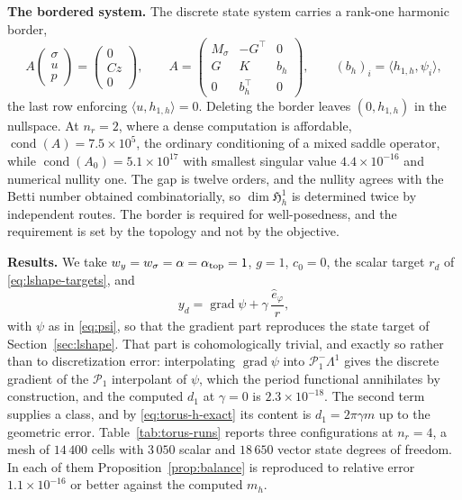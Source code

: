 \documentclass{article}
\DeclareMathOperator{\grad}{grad}
\newcommand{\HH}{\mathfrak H}
\newcommand{\ip}[2]{\langle #1,#2\rangle}
\begin{document}
\medskip
\noindent\textbf{The bordered system.}
The discrete state system carries a rank-one harmonic border,
\begin{equation}
  A\begin{pmatrix}\sigma\\u\\p\end{pmatrix}
  =\begin{pmatrix}0\\Cz\\0\end{pmatrix},
  \qquad
  A=\begin{pmatrix}
      M_{\sigma}&-G^{\top}&0\\ G&K&b_{h}\\ 0&b_{h}^{\top}&0
    \end{pmatrix},
  \qquad (b_{h})_{i}=\ip{h_{1,h}}{\psi_{i}},
\end{equation}
the last row enforcing $\ip{u}{h_{1,h}}=0$. Deleting the border leaves
$(0,h_{1,h})$ in the nullspace. At $n_{r}=2$, where a dense computation is
affordable, $\operatorname{cond}(A)=7.5\times10^{5}$, the ordinary
conditioning of a mixed saddle operator, while
$\operatorname{cond}(A_{0})=5.1\times10^{17}$ with smallest singular value
$4.4\times10^{-16}$ and numerical nullity one. The gap is twelve orders, and
the nullity agrees with the Betti number obtained combinatorially, so
$\dim\HH^{1}_{h}$ is determined twice by independent routes. The border is
required for well-posedness, and the requirement is set by the topology and
not by the objective.

\medskip
\noindent\textbf{Results.}
We take $w_{y}=w_{\sigma}=\alpha=\alpha_{\rm top}=1$, $g=1$, $c_{0}=0$, the
scalar target $r_{d}$ of \eqref{eq:lshape-targets}, and
\[
  y_{d}=\grad\psi+\gamma\,\frac{\hat e_{\varphi}}{r},
\]
with $\psi$ as in \eqref{eq:psi}, so that the gradient part reproduces the
state target of Section~\ref{sec:lshape}. That part is cohomologically
trivial, and exactly so rather than to discretization error: interpolating
$\grad\psi$ into $\mathcal{P}^{-}_{1}\Lambda^{1}$ gives the discrete gradient
of the $\mathcal{P}_{1}$ interpolant of $\psi$, which the period functional
annihilates by construction, and the computed $d_{1}$ at $\gamma=0$ is
$2.3\times10^{-18}$. The second term supplies a class, and by
\eqref{eq:torus-h-exact} its content is $d_{1}=2\pi\gamma m$ up to the
geometric error. Table~\ref{tab:torus-runs} reports three configurations at
$n_{r}=4$, a mesh of $14\,400$ cells with $3\,050$ scalar and $18\,650$ vector
state degrees of freedom. In each of them Proposition~\ref{prop:balance} is
reproduced to relative error $1.1\times10^{-16}$ or better against the
computed $m_{h}$.
\end{document}
